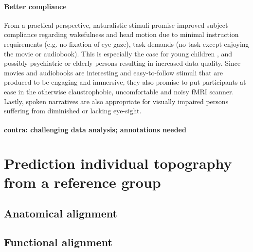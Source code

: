\paragraph{Better compliance}

%
From a practical perspective, naturalistic stimuli promise improved subject
compliance regarding wakefulness and head motion due to minimal instruction
requirements (e.g. no fixation of eye gaze), task demands (no task except
enjoying the movie or audiobook).
%
This is especially the case for young children \citep{vanderwal2015inscapes},
and possibly psychiatric \citep{eickhoff2020towards} or elderly persons
resulting in increased data quality.
%
Since movies and audiobooks are interesting and easy-to-follow stimuli that are
produced to be engaging and immersive, they also promise to put participants at
ease in the otherwise claustrophobic, uncomfortable and noisy fMRI scanner.
%
Lastly, spoken narratives are also appropriate for visually impaired persons
suffering from diminished or lacking eye-sight.

\paragraph{contra: challenging data analysis; annotations needed}



\section{Prediction individual topography from a reference group}




\subsection{Anatomical alignment}



\subsection{Functional alignment}


